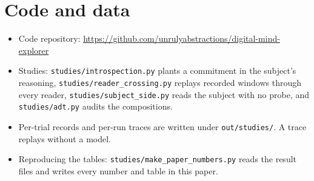 \section*{Code and data}

\begin{itemize}[leftmargin=1.4em,itemsep=0.1em,topsep=0.25em]
  \item Code repository: \url{https://github.com/unrulyabstractions/digital-mind-explorer}
  \item Studies: \texttt{studies/introspection.py} plants a commitment in the
        subject's reasoning, \texttt{studies/reader\_crossing.py} replays
        recorded windows through every reader,
        \texttt{studies/subject\_side.py} reads the subject with no probe, and
        \texttt{studies/adt.py} audits the compositions.
  \item Per-trial records and per-run traces are written under
        \texttt{out/studies/}. A trace replays without a model.
  \item Reproducing the tables: \texttt{studies/make\_paper\_numbers.py} reads
        the result files and writes every number and table in this paper.
\end{itemize}
